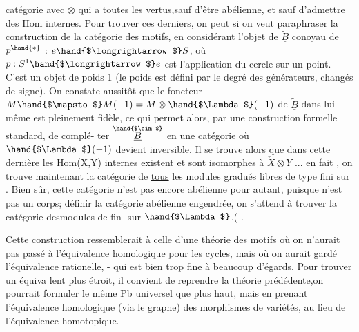 catégorie avec $\otimes$ qui a toutes les vertus,sauf d'être abélienne, et
sauf d'admettre des \uline{Hom} internes. Pour trouver ces derniers, on peut
si on veut paraphraser la construction de la catégorie des motifs, en
 considérant l'objet  de $\tilde{\underline{B}}$ conoyau de
$p^{\hand{*}}$ : $e \hand{$\longrightarrow$} S$, où $p:S^{1} \hand{$\longrightarrow$} e$ est l'application du cercle sur un
point. C'est un objet de poids 1 (le poids est défini par le degré 
des générateurs, changés de signe). On constate aussitôt que le
foncteur $M\hand{$\mapsto$} M(-1)=M\otimes\hand{$\Lambda$}(-1)$ de $\tilde{\underline{B}}$ dans lui-même est pleinement fidèle,
ce qui permet alors, par une construction formelle standard, de complé-%
ter $\overset{\hand{$\sim$}}{\underline{B}}$ en une catégorie où $\hand{$\Lambda$}(-1)$ devient inversible. Il se trouve
alors que dans cette dernière les \uline{Hom}(X,Y) internes existent et
 sont isomorphes à $\check{X}\otimes Y$ ... en fait , on trouve maintenant la
catégorie de \uline{tous} les modules gradués libres de type fini sur \quad .
Bien sûr, cette catégorie n'est pas encore abélienne pour autant,
puisque \quad n'est pas un corps;   définir la catégorie abélienne
engendrée, on s'attend à trouver la catégorie \hand{/}desmodules de   fin-%
sur $\hand{$\Lambda$}$.(  
  .

Cette construction ressemblerait à celle d'une théorie des
motifs où on n'aurait pas passé à l'équivalence homologique pour
les cycles, mais où on aurait gardé l'équivalence rationelle, - qui
est bien trop fine à beaucoup d'égards. Pour trouver un équiva%
lent plus étroit, il convient de reprendre la théorie prédédente,on
pourrait formuler le même Pb universel que plus haut, mais en prenant
l'équivalence homologique (via le graphe) des morphismes de variétés,
au lieu de l'équivalence homotopique. 

